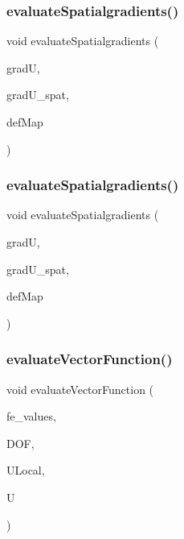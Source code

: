 \subsubsection{\texorpdfstring{evaluateSpatialgradients()}{evaluateSpatialgradients()}\hspace{0.1cm}{\footnotesize\ttfamily [1/2]}}
{\footnotesize\ttfamily void evaluate\+Spatialgradients (\begin{DoxyParamCaption}\item[{Table$<$ 2, T $>$ \&}]{gradU,  }\item[{Table$<$ 2, T $>$}]{grad\+U\+\_\+spat,  }\item[{\mbox{\hyperlink{structdeformation_map}{deformation\+Map}}$<$ T, dim $>$ \&}]{def\+Map }\end{DoxyParamCaption})}

\mbox{\label{group___evaluation_functions_ga0b976342d491f6215953e2e65ea6a0de}} 
\subsubsection{\texorpdfstring{evaluateSpatialgradients()}{evaluateSpatialgradients()}\hspace{0.1cm}{\footnotesize\ttfamily [2/2]}}
{\footnotesize\ttfamily void evaluate\+Spatialgradients (\begin{DoxyParamCaption}\item[{Table$<$ 3, T $>$ \&}]{gradU,  }\item[{Table$<$ 3, T $>$}]{grad\+U\+\_\+spat,  }\item[{\mbox{\hyperlink{structdeformation_map}{deformation\+Map}}$<$ T, dim $>$ \&}]{def\+Map }\end{DoxyParamCaption})}

\mbox{\label{group___evaluation_functions_gab9e164be1be244df81c932426a4bd513}} 
\subsubsection{\texorpdfstring{evaluateVectorFunction()}{evaluateVectorFunction()}}
{\footnotesize\ttfamily void evaluate\+Vector\+Function (\begin{DoxyParamCaption}\item[{const F\+E\+Values$<$ dim $>$ \&}]{fe\+\_\+values,  }\item[{unsigned int}]{D\+OF,  }\item[{Table$<$ 1, T $>$ \&}]{U\+Local,  }\item[{Table$<$ 2, T $>$ \&}]{U }\end{DoxyParamCaption})}

